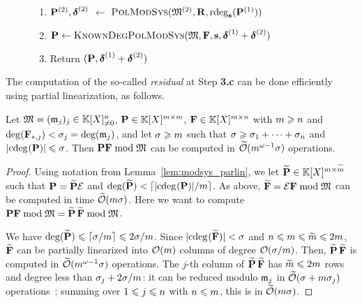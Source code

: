 \documentclass[preprint]{sig-alternate-05-2015}
\begin{document}
\begin{figure}[h!]
{\begin{minipage}{8.2cm}
\begin{algo} 
\begin{enumerate}[{\bf 1.}]
\begin{enumerate}[{\bf a.}]
      \item $\msb^{(2)},\minDegs^{(2)}$ $\leftarrow$ $\algoname{PolModSys}(\Modulus^{(2)},\mat{R},\rdeg[\shifts]{\msb^{(1)}})$
      \item $\msb \leftarrow \algoname{KnownDegPolModSys}(\Modulus,\sys,\shifts,\minDegs^{(1)}+\minDegs^{(2)})$ 
      \item Return $(\msb,\minDegs^{(1)}+\minDegs^{(2)})$
    \end{enumerate}
    \vspace{-0.1cm}
\end{enumerate}
\end{algo}
\end{minipage}} 
\vspace{-0.4cm}
\end{figure}

The computation of the so-called \emph{residual} at Step \textbf{3.c} can be
done efficiently using partial linearization, as follows.

\vspace{-0.15cm}
\begin{lem}
\label{lem:residual}
Let $\mathfrak{M} = (\mathfrak{m}_j)_j \in \mathbb{K}[X]_{\neq 0}^n$, $\mat{P} \in
\polMatSpace[\rdim]$, $\mat{F} \in \polMatSpace[\rdim][\cdim]$ with $m \geqslant
n$ and $\deg(\matcol{\mat{F}}{j}) < \degMod_j = \deg(\modulus_j)$, and let
$\sigma \geqslant m$ such that $\sigma \geqslant \sigma_1 + \cdots + \sigma_n$
and $\sumVec{\cdeg{\mat{P}}} \le \degMod$. Then $\mat{P} \mat{F} \bmod
\Modulus$ can be computed in $\widetilde{\mathcal{O}}(m^{\omega-1} \sigma)$ operations.
\end{lem}
\begin{proof}
\vspace{-0.15cm}
Using notation from Lemma~\ref{lem:modsys_parlin}, we let $\expand{\mat{P}} \in
\polMatSpace[\rdim][\expand{\rdim}]$ such that $\mat{P} = \expand{\mat{P}}
\expandMat$ and $\deg(\expand{\mat{P}}) < \lceil \sumVec{\cdeg{\mat{P}}} /
\rdim \rceil$. As above, $\expand{\sys} = \expandMat \sys \bmod \Modulus$ can
be computed in time $\widetilde{\mathcal{O}}(m \sigma)$. Here we want to compute $\mat{P}
\sys \bmod \Modulus = \expand{\mat{P}} \, \expand{\sys} \bmod \Modulus$.

We have $\deg(\expand{\mat{P}}) \le \lceil \degMod / \rdim \rceil \le 2
\degMod/\rdim$. Since $\sumVec{\cdeg{\expand{\mat{F}}}} < \degMod$ and $n
\leqslant m \leqslant \widetilde{m} \leqslant 2m$, $\expand{\mat{F}}$ can be partially
linearized into $\mathcal{O}(m)$ columns of degree $\mathcal{O}(\sigma/m)$. Then,
$\expand{\mat{P}} \, \expand{\sys}$ is computed in $\widetilde{\mathcal{O}}(m^{\omega-1}
\sigma)$ operations.
The $j$-th column of $\expand{\mat{P}} \, \expand{\sys}$ has $\widetilde{m}
\leqslant 2m$ rows and degree less than $\sigma_j + 2\sigma/m$: it can be
reduced modulo $\mathfrak{m}_j$ in $\widetilde{\mathcal{O}}(\sigma + m \sigma_j)$
operations~\cite[Chapter~9]{vzGathen13}; summing over $1 \leqslant j \leqslant n$ with
$n \leqslant m$, this is in $\widetilde{\mathcal{O}}(m \sigma)$.
\end{proof}
\end{document}
